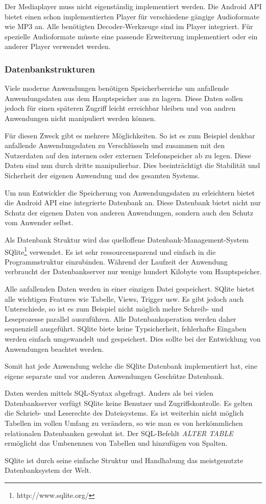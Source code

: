 Der Mediaplayer muss nicht eigenständig implementiert werden. Die Android API bietet einen schon implementierten Player für verschiedene gängige Audioformate wie MP3 an. Alle benötigten Decoder-Werkzeuge sind im Player integriert. Für spezielle Audioformate müsste eine passende Erweiterung implementiert oder ein anderer Player verwendet werden.

\subsubsection{Datenbankstrukturen}
\label{Datenbankstrukturen}
Viele moderne Anwendungen benötigen Speicherbereiche um anfallende Anwendungsdaten aus dem Hauptspeicher aus zu lagern. Diese Daten sollen jedoch für einen späteren Zugriff leicht erreichbar bleiben und von andren Anwendungen nicht manipuliert werden können.

Für diesen Zweck gibt es mehrere Möglichkeiten. So ist es zum Beispiel denkbar anfallende Anwendungsdaten zu Verschlüsseln und zusammen mit den Nutzerdaten auf den internen oder externen Telefonspeicher ab zu legen. Diese Daten sind nun durch dritte manipulierbar. Dies beeinträchtigt die Stabilität und Sicherheit der eigenen Anwendung und des gesamten Systems.

Um nun Entwickler die Speicherung von Anwendungsdaten zu erleichtern bietet die Android API eine integrierte Datenbank an. Diese Datenbank bietet nicht nur Schutz der eigenen Daten von anderen Anwendungen, sondern auch den Schutz vom Anwender selbst.

Als Datenbank Struktur wird das quelloffene Datenbank-Management-System SQlite\footnote{http://www.sqlite.org/} verwendet. Es ist sehr ressourcensparend und einfach in die Programmstruktur einzubinden. Während der Laufzeit der Anwendung verbraucht der Datenbankserver nur wenige hundert Kilobyte vom Hauptspeicher.

Alle anfallenden Daten werden in einer einzigen Datei gespeichert. SQlite bietet alle wichtigen Features wie Tabelle, Views, Trigger usw. Es gibt jedoch auch Unterschiede, so ist es zum Beispiel nicht möglich mehre Schreib- und Leseprozesse parallel auszuführen. Alle Datenbankoperation werden daher sequenziell ausgeführt. SQlite biete keine Typsicherheit, fehlerhafte Eingaben werden einfach umgewandelt und gespeichert. Dies sollte bei der Entwicklung von Anwendungen beachtet werden.

Somit hat jede Anwendung welche die SQlite Datenbank implementiert hat, eine eigene separate und vor anderen Anwendungen Geschütze Datenbank.

Daten werden mittels SQL-Syntax abgefragt. Anders als bei vielen Datenbankserver verfügt SQlite keine Benutzer und Zugriffskontrolle. Es gelten die Schrieb- und Leserechte des Dateisystems. Es ist weiterhin nicht möglich Tabellen im vollen Umfang zu verändern, so wie man es von herkömmlichen relationalen Datenbanken gewohnt ist. Der SQL-Befehlt \textit{ALTER TABLE} ermöglicht das Umbenennen von Tabellen und hinzufügen von Spalten.

SQlite ist durch seine einfache Struktur und Handhabung das meistgenutzte Datenbanksystem der Welt.
